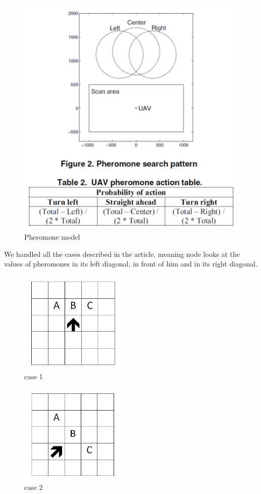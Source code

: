 \begin{figure}[!h]
\center
\includegraphics{../images/pheromon_model.png}
\caption{Pheromone model}
\end{figure}

\newpage

We handled all the cases described in the article, meaning node looks at the values of pheromones in its left diagonal, in front of him and in its right diagonal.

\begin{figure}[!h]
\center
\includegraphics[width=5cm]{../images/grille_case_1.png}
\caption{\label{case1}case 1}
\end{figure}

\newpage

\begin{figure}[!h]
\center
\includegraphics[width=5cm]{../images/grille_case_2.png}
\caption{\label{case2}case 2}
\end{figure}

